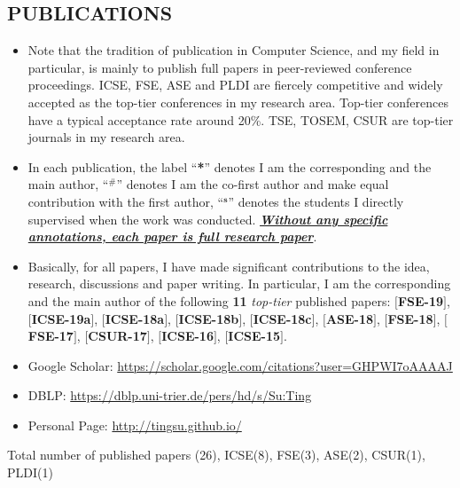 \documentclass[margin]{res}
\begin{document}
\begin{resume}
\section{PUBLICATIONS}
\begin{itemize}[leftmargin=*]
    \item Note that the tradition of publication in Computer Science, and my field in particular, is mainly
to publish full papers in peer-reviewed conference proceedings. ICSE, FSE, ASE and PLDI are fiercely competitive and widely accepted as the top-tier conferences in my research area. Top-tier conferences have a typical acceptance rate around 20\%. TSE, TOSEM, CSUR are top-tier journals in my research area.
    \item In each publication, the label ``\textbf{*}'' denotes I am the corresponding and the main author, ``$^{\textbf{\#}}$'' denotes I am the co-first author and make equal contribution with the first author,  ``$^{\textbf{s}}$'' denotes the students I directly supervised when the work was conducted. \emph{\textbf{\underline{Without any specific annotations, each paper is full research paper}}}.
    \item Basically, for all papers, I have made significant contributions to the idea, research, discussions and paper writing. In particular, I am the corresponding and the main author of the following \textbf{11} \emph{top-tier} published papers: $[$\textbf{FSE-19}$]$, $[$\textbf{ICSE-19a}$]$, $[$\textbf{ICSE-18a}$]$, $[$\textbf{ICSE-18b}$]$, $[$\textbf{ICSE-18c}$]$, $[$\textbf{ASE-18}$]$, $[$\textbf{FSE-18}$]$, $[$\textbf{FSE-17}$]$, $[$\textbf{CSUR-17}$]$, $[$\textbf{ICSE-16}$]$, $[$\textbf{ICSE-15}$]$.
\end{itemize}

\begin{itemize}[leftmargin=*]
    \item Google Scholar: \url{https://scholar.google.com/citations?user=GHPWI7oAAAAJ}
    \item DBLP: \url{https://dblp.uni-trier.de/pers/hd/s/Su:Ting}
    \item Personal Page: \url{http://tingsu.github.io/}
\end{itemize}

 Total number of published papers (26), ICSE(8), FSE(3), ASE(2), CSUR(1), PLDI(1)


\end{resume}
\end{document}
